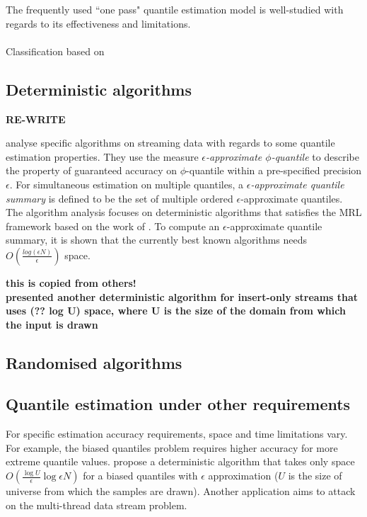    The frequently used ``one pass" quantile estimation model is well-studied with regards to its effectiveness and limitations.
    \\\\
    Classification based on \cite{buragohainQuantilesStreams2009}

    \subsection{Deterministic algorithms}
    \label{deterministic}
    \textbf{RE-WRITE } 

    \citeauthor{greenwaldQuantilesEquidepthHistograms2016a}\cite{greenwaldQuantilesEquidepthHistograms2016a} analyse specific algorithms on streaming data with regards to some quantile estimation properties. 
    They use the measure \textit{$\epsilon$-approximate $\phi$-quantile} to describe the property of guaranteed accuracy on $\phi$-quantile within a pre-specified precision $\epsilon$. 
    For simultaneous estimation on multiple quantiles, a \textit{$\epsilon$-approximate quantile summary} is defined to be the set of multiple ordered $\epsilon$-approximate quantiles.
    The algorithm analysis focuses on deterministic algorithms that satisfies the MRL framework based on the work of \citeauthor{mankuApproximateMediansOthera} \cite{mankuApproximateMediansOthera}. To compute an $\epsilon$-approximate quantile summary, it is shown that the currently best known algorithms needs $O(\frac{log(\epsilon N)} {\epsilon})$ space.

    \textbf{ this is copied from others!\\
        \citeauthor{shrivastavaMediansNewAggregation2004} \cite{shrivastavaMediansNewAggregation2004}
         presented another deterministic algorithm for insert-only streams that uses (?? log U) space, where U is the size of the domain from which the input is drawn
        }


    \subsection{Randomised algorithms}
    \label{randomised}
    \cite{guhaStreamOrderOrder2009}


    \subsection{Quantile estimation under other requirements}
    \label{other}
    For specific estimation accuracy requirements, space and time limitations vary. For example, the biased quantiles problem requires higher accuracy for more extreme quantile values. \citeauthor{cormodeSpaceTimeefficientDeterministic2006} \cite{cormodeSpaceTimeefficientDeterministic2006} propose a deterministic algorithm that takes only space $O(\frac{\log {U}}{\epsilon} \log {\epsilon N})$ for a biased quantiles with $\epsilon$ approximation ($U$ is the size of universe from which the samples are drawn). 
    Another application aims to attack on the multi-thread data stream problem. \cite{ben-haimStreamingParallelDecision} 

